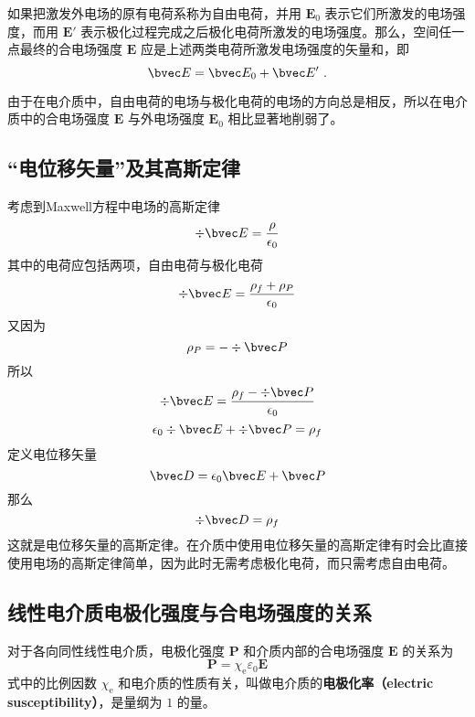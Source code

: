 

如果把激发外电场的原有电荷系称为自由电荷，并用 $\mathbf E_0$ 表示它们所激发的电场强度，而用 $\mathbf E'$ 表示极化过程完成之后极化电荷所激发的电场强度。那么，空间任一点最终的合电场强度 $\mathbf E $ 应是上述两类电荷所激发电场强度的矢量和，即
\begin{equation}
\bvec E = \bvec E_{0} + \bvec E'~.
\end{equation}

由于在电介质中，自由电荷的电场与极化电荷的电场的方向总是相反，所以在电介质中的合电场强度 $\mathbf E $ 与外电场强度 $\mathbf E_0$ 相比显著地削弱了。

\subsection{“电位移矢量”及其高斯定律}
考虑到Maxwell方程中电场的高斯定律
$$\div \bvec E = \frac{\rho}{\epsilon_0}$$
其中的电荷应包括两项，自由电荷与极化电荷
$$\div \bvec E = \frac{\rho_f+\rho_P}{\epsilon_0}$$
又因为
$$\rho_P=-\div \bvec P$$
所以
$$\div \bvec E = \frac{\rho_f-\div \bvec P}{\epsilon_0}$$
$$\epsilon_0 \div \bvec E + \div \bvec P= \rho_f$$
定义电位移矢量 
\begin{equation}
\bvec D = \epsilon_0 \bvec E + \bvec P
\end{equation}
那么
\begin{equation}
\div \bvec D = \rho_f
\end{equation}
这就是电位移矢量的高斯定律。在介质中使用电位移矢量的高斯定律有时会比直接使用电场的高斯定律简单，因为此时无需考虑极化电荷，而只需考虑自由电荷。

\subsection{线性电介质电极化强度与合电场强度的关系}
对于各向同性线性电介质，电极化强度 $\mathbf P $ 和介质内部的合电场强度 $\mathbf E $ 的关系为%
\begin{equation} 
\mathbf P=\chi_{\mathrm e} \varepsilon_{0} \mathbf E
\end{equation}
式中的比例因数 $\chi_{\mathrm{e}}$ 和电介质的性质有关，叫做电介质的\textbf{电极化率（electric susceptibility）}，是量纲为 $1 $ 的量。

